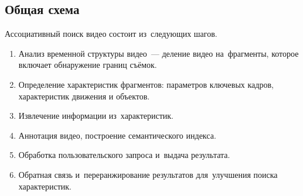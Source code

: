 \subsection{Общая схема}

Ассоциативный поиск видео состоит из~следующих шагов.
\begin{enumerate}
    \item Анализ временной структуры видео~—
        деление видео на~фрагменты, которое включает обнаружение границ съёмок.
    \item Определение характеристик фрагментов:
        параметров ключевых кадров,
        характеристик движения и объектов.
    \item Извлечение информации из~характеристик.
    \item Аннотация видео, построение семантического индекса.
    \item Обработка пользовательского запроса и~выдача результата.
    \item Обратная связь и~переранжирование результатов для~улучшения поиска характеристик.
\end{enumerate}

\pagebreak


